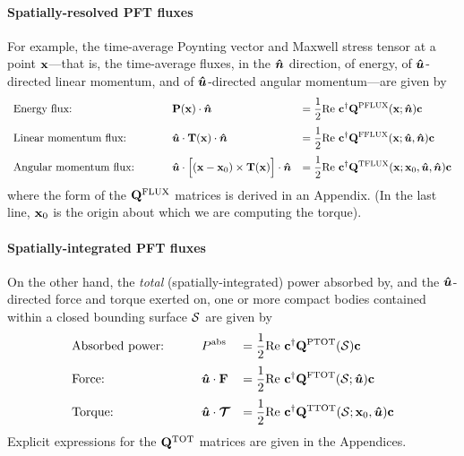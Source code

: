 \documentclass[letterpaper]{article}
\begin{document}
\paragraph{Spatially-resolved PFT fluxes} 
For example, the time-average Poynting vector and Maxwell stress 
tensor at a point $\mathbf{x}$---that is, the time-average fluxes,
in the $\boldsymbol{\hat{n}}$ direction, of energy, of $\boldsymbol{\hat{u}}$-directed
linear momentum, and of $\boldsymbol{\hat{u}}$-directed angular momentum---are
given by
$$\begin{array}{*3{>{\displaystyle}l}}
\text{Energy flux: } \qquad 
&\vb P(\vb x) \cdot \vbhat{n} 
&=\frac{1}{2}\text{Re }
   \vb c^\dagger \vb Q\supt{PFLUX}(\vb x; \vbhat{n}) \vb c
\\[10pt]
\text{Linear momentum flux: } \qquad 
&\vbhat{u} \cdot \vb T(\vb x) \cdot \vbhat{n}
&=\frac{1}{2}\text{Re }
   \vb c^\dagger \vb Q\supt{FFLUX}(\vb x; \vbhat{u}, \vbhat{n}) \vb c
\\[10pt]
\text{Angular momentum flux: } \qquad 
&\vbhat{u} \cdot \Big[(\vb x-\vb x_0) \times \vb T(\vb x)\Big] \cdot \vbhat{n}
&=\frac{1}{2}\text{Re }
   \vb c^\dagger \vb Q\supt{TFLUX}(\vb x; \vb x_0, \vbhat{u}, \vbhat{n}) \vb c
\end{array}$$
where the form of the $\mathbf{Q}^{\text{\scriptsize FLUX}}$ matrices is derived in
an Appendix. (In the last line, $\mathbf{x}_0$ is the origin about which 
we are computing the torque).

\paragraph{Spatially-integrated PFT fluxes} 
On the other hand, the \textit{total} (spatially-integrated)
power absorbed by, and the $\boldsymbol{\hat{u}}$-directed force and torque 
exerted on, one or more compact bodies contained within a 
closed bounding surface $\mathcal{S}$ are given by 
$$\begin{array}{*3{>{\displaystyle}l}}
\text{Absorbed power:} \qquad 
& P\sups{abs}
&=\frac{1}{2}\text{Re }
   \vb c^\dagger \vb Q\supt{PTOT}(\mc S) \vb c
\\[10pt]
\text{Force: } \qquad 
&\vbhat{u} \cdot \vb F
&=\frac{1}{2}\text{Re }
   \vb c^\dagger \vb Q\supt{FTOT}(\mc S; \vbhat{u}) \vb c
\\[10pt]
\text{Torque: } \qquad 
&\vbhat{u} \cdot \bmc T
&=\frac{1}{2}\text{Re }
   \vb c^\dagger \vb Q\supt{TTOT}(\mc S; \vb x_0, \vbhat{u}) \vb c
\end{array}$$
Explicit expressions for the $\mathbf{Q}^{\text{\scriptsize TOT}}$ matrices are given
in the Appendices.
\end{document}
